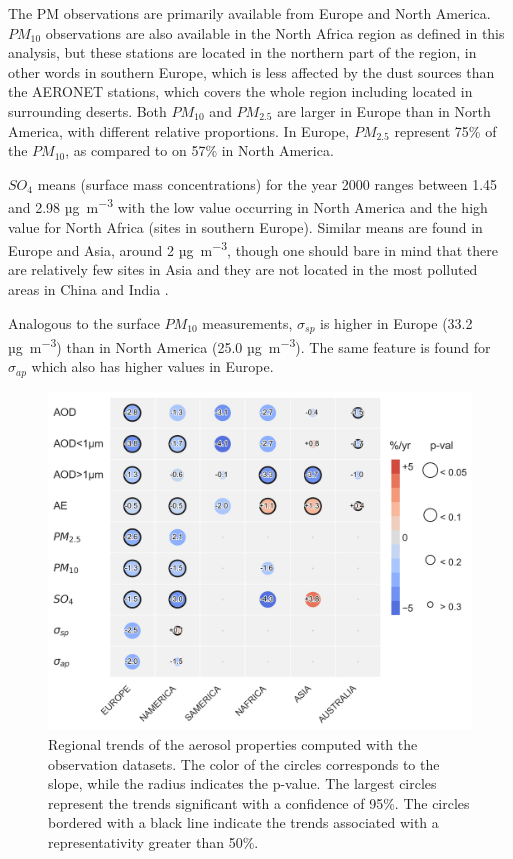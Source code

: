 \documentclass[journal abbreviation, manuscript]{copernicus}
\begin{document}
The PM observations are primarily available from Europe and North America. $PM_{10}$ observations are also available in the North Africa region as defined in this analysis, but these stations are  located in the northern part of the region, in other words in southern Europe, which is less affected by the dust sources than the AERONET stations, which covers the whole region including located in surrounding deserts. Both $PM_{10}$ and $PM_{2.5}$ are larger in Europe than in North America, with different relative proportions. In Europe, $PM_{2.5}$ represent 75\% of the $PM_{10}$, as compared to on 57\% in North America.

$SO_{4}$ means (surface mass concentrations) for the year 2000 ranges between 1.45 and 2.98 \unit{µg.m^{-3}} with the low value occurring in North America and the high value for North Africa (sites in southern Europe). Similar means are found in Europe and Asia, around 2 \unit{µg.m^{-3}}, though one should bare in mind that there are relatively few sites in Asia and they are not located in the most polluted areas in China and India \citep{aas2019global}.

Analogous to the surface $PM_{10}$ measurements, $\sigma_{sp}$ is higher in Europe (33.2 \unit{µg.m^{-3}}) than in North America (25.0 \unit{µg.m^{-3}}). The same feature is found for $\sigma_{ap}$ which also has higher values in Europe.

\begin{figure}[t]
 \includegraphics[width=12cm]{../scripts/figs/heatmaps/OBS.png}
 \caption{Regional trends of the aerosol properties computed with the observation datasets. The color of the circles corresponds to the slope, while the radius indicates the p-value. The largest circles represent the trends significant with a confidence of 95\%. The circles bordered with a black line indicate the trends associated with a representativity greater than 50\%.}
 \label{fig:obs_trends}
\end{figure}
\end{document}
